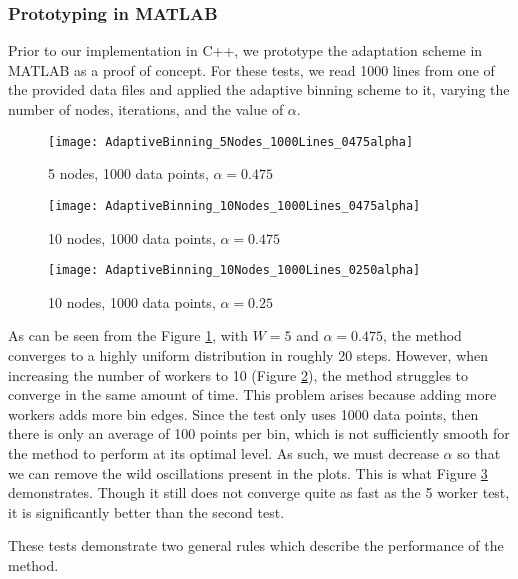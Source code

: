\documentclass{article}
\begin{document}
\subsubsection{Prototyping in MATLAB}
Prior to our implementation in C++, we prototype the adaptation scheme in MATLAB as a proof of concept. For these tests, we read 1000 lines from one of the provided data files and applied the adaptive binning scheme to it, varying the number of nodes, iterations, and the value of $\alpha$.
\begin{figure}[!htb]
	\centering
	\vspace{-5pt}
	\texttt{[image: AdaptiveBinning\_5Nodes\_1000Lines\_0475alpha]}
	\vspace{-10pt}
	\caption{5 nodes, 1000 data points, $\alpha = 0.475$}
	\label{5,0.475}
\end{figure}
\begin{figure}[!htb]
	\centering
	\vspace{-5pt}
	\texttt{[image: AdaptiveBinning\_10Nodes\_1000Lines\_0475alpha]}
	\vspace{-10pt}
	\caption{10 nodes, 1000 data points, $\alpha = 0.475$}
	\label{10,0.475}
\end{figure}
\begin{figure}[!htb]
	\centering
	\vspace{-5pt}
	\texttt{[image: AdaptiveBinning\_10Nodes\_1000Lines\_0250alpha]}
	\vspace{-10pt}
	\caption{10 nodes, 1000 data points, $\alpha = 0.25$}
	\label{10,0.250}
\end{figure}

As can be seen from the Figure \ref{5,0.475}, with $W=5$ and $\alpha=0.475$, the method converges to a highly uniform distribution in roughly 20 steps. However, when increasing the number of workers to 10 (Figure \ref{10,0.475}), the method struggles to converge in the same amount of time. This problem arises because adding more workers adds more bin edges. Since the test only uses 1000 data points, then there is only an average of 100 points per bin, which is not sufficiently smooth for the method to perform at its optimal level. As such, we must decrease $\alpha$ so that we can remove the wild oscillations present in the plots. This is what Figure \ref{10,0.250} demonstrates. Though it still does not converge quite as fast as the 5 worker test, it is significantly better than the second test.

These tests demonstrate two general rules which describe the performance of the method.
\end{document}
